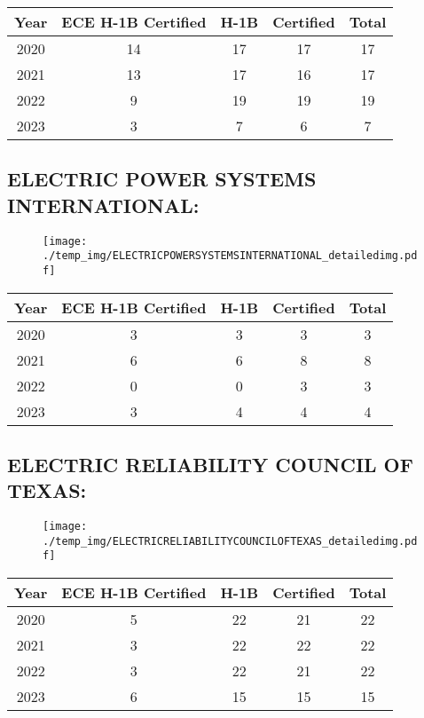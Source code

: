 \documentclass{article}%
\begin{document}
%
\begin{longtable}{c|c|c|c|c}%
\hline%
Year&ECE H{-}1B Certified&H{-}1B&Certified&Total\\%
\hline%
2020&14&17&17&17\\%
\hline%
2021&13&17&16&17\\%
\hline%
2022&9&19&19&19\\%
\hline%
2023&3&7&6&7\\%
\hline%
\end{longtable}

%
\newpage%
\subsection{ELECTRIC POWER SYSTEMS INTERNATIONAL:}%
\label{subsec:ELECTRICPOWERSYSTEMSINTERNATIONAL}%
\label{ELECTRICPOWERSYSTEMSINTERNATIONALdetailed}%


\begin{figure}[htbp]%
\centering%
\texttt{[image: ./temp\_img/ELECTRICPOWERSYSTEMSINTERNATIONAL\_detailedimg.pdf]}%
\end{figure}

%
\begin{longtable}{c|c|c|c|c}%
\hline%
Year&ECE H{-}1B Certified&H{-}1B&Certified&Total\\%
\hline%
2020&3&3&3&3\\%
\hline%
2021&6&6&8&8\\%
\hline%
2022&0&0&3&3\\%
\hline%
2023&3&4&4&4\\%
\hline%
\end{longtable}

%
\newpage%
\subsection{ELECTRIC RELIABILITY COUNCIL OF TEXAS:}%
\label{subsec:ELECTRICRELIABILITYCOUNCILOFTEXAS}%
\label{ELECTRICRELIABILITYCOUNCILOFTEXASdetailed}%


\begin{figure}[htbp]%
\centering%
\texttt{[image: ./temp\_img/ELECTRICRELIABILITYCOUNCILOFTEXAS\_detailedimg.pdf]}%
\end{figure}

%
\begin{longtable}{c|c|c|c|c}%
\hline%
Year&ECE H{-}1B Certified&H{-}1B&Certified&Total\\%
\hline%
2020&5&22&21&22\\%
\hline%
2021&3&22&22&22\\%
\hline%
2022&3&22&21&22\\%
\hline%
2023&6&15&15&15\\%
\hline%
\end{longtable}
\end{document}
